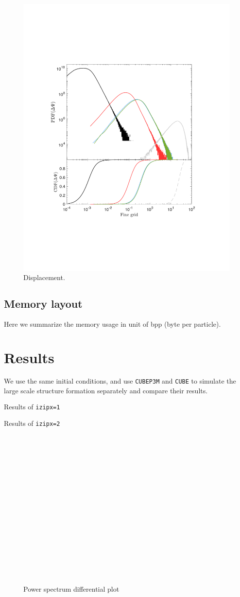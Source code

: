 \documentclass[10pt,twocolumn,preprint]{emulateapj}
\begin{document}
\begin{figure}[t]
\centering
  \includegraphics[width=0.95\linewidth]{ddsp_pcdf_256_box80.pdf}
 \caption{Displacement.}
\label{fig.dsp}
\end{figure}

\subsection{Memory layout}
Here we summarize the memory usage in unit of bpp (byte per particle).

\section{Results}
We use the same initial conditions, and use {\tt CUBEP3M} and {\tt CUBE} to simulate the large scale structure formation separately and compare their results.

Results of {\tt izipx=1}

Results of {\tt izipx=2}

\begin{figure}[h]
\begin{verbatim}
















\end{verbatim}

\caption{Power spectrum differential plot}
\label{fig.power}
\end{figure}
\end{document}
